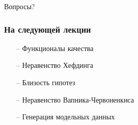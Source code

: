 \documentclass[10pt]{beamer}
\begin{document}
\begin{frame}[standout]
  Вопросы?
\end{frame}

\appendix

\begin{frame}\frametitle{На следующей лекции}
	\begin{itemize}
    	\item[--] Функционалы качества
    	\item[--] Неравенство Хефдинга
    	\item[--] Близость гипотез
    	\item[--] Неравенство Вапника-Червоненкиса
    	\item[--] Генерация модельных данных    	    	
	\end{itemize}
\end{frame}
\end{document}
